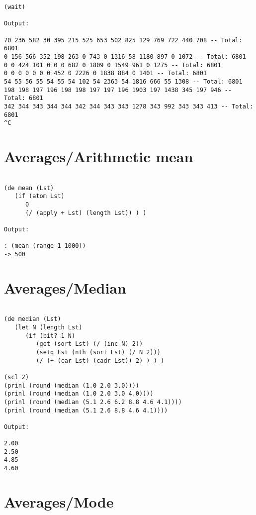 \begin{verbatim}
(wait)

Output:

70 236 582 30 395 215 525 653 502 825 129 769 722 440 708 -- Total: 6801
0 156 566 352 198 263 0 743 0 1316 58 1180 897 0 1072 -- Total: 6801
0 0 424 101 0 0 0 682 0 1809 0 1549 961 0 1275 -- Total: 6801
0 0 0 0 0 0 0 452 0 2226 0 1838 884 0 1401 -- Total: 6801
54 55 56 55 54 55 54 102 54 2363 54 1816 666 55 1308 -- Total: 6801
198 198 197 196 198 198 197 197 196 1903 197 1438 345 197 946 -- Total: 6801
342 344 343 344 344 342 344 343 343 1278 343 992 343 343 413 -- Total: 6801
^C

\end{verbatim}

\section*{Averages/Arithmetic mean}

\begin{verbatim}

(de mean (Lst)
   (if (atom Lst)
      0
      (/ (apply + Lst) (length Lst)) ) )

Output:

: (mean (range 1 1000))
-> 500

\end{verbatim}

\section*{Averages/Median}

\begin{verbatim}

(de median (Lst)
   (let N (length Lst)
      (if (bit? 1 N)
         (get (sort Lst) (/ (inc N) 2))
         (setq Lst (nth (sort Lst) (/ N 2)))
         (/ (+ (car Lst) (cadr Lst)) 2) ) ) )

(scl 2)
(prinl (round (median (1.0 2.0 3.0))))
(prinl (round (median (1.0 2.0 3.0 4.0))))
(prinl (round (median (5.1 2.6 6.2 8.8 4.6 4.1))))
(prinl (round (median (5.1 2.6 8.8 4.6 4.1))))

Output:

2.00
2.50
4.85
4.60

\end{verbatim}

\section*{Averages/Mode}

